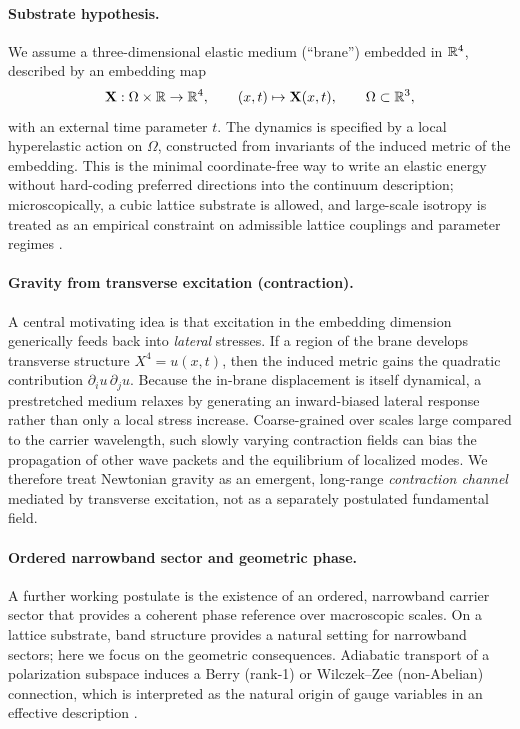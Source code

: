 \paragraph{Substrate hypothesis.}
We assume a three-dimensional elastic medium (``brane'') embedded in $\mathbb{R}^4$, described by an embedding map
\begin{equation}
  \mathbf{X}:\Omega\times\mathbb{R} \to \mathbb{R}^4, \qquad (x,t)\mapsto \mathbf{X}(x,t), \qquad \Omega\subset\mathbb{R}^3,
  \label{eq:embedding-map}
\end{equation}
with an external time parameter $t$.
The dynamics is specified by a local hyperelastic action on $\Omega$, constructed from invariants of the
induced metric of the embedding.
This is the minimal coordinate-free way to write an elastic energy without hard-coding preferred directions into the
continuum description; microscopically, a cubic lattice substrate is allowed, and large-scale isotropy is treated as an
empirical constraint on admissible lattice couplings and parameter regimes \citep{Ogden1984,Holzapfel2000,DoCarmo1992}.

\paragraph{Gravity from transverse excitation (contraction).}
A central motivating idea is that excitation in the embedding dimension generically feeds back into
\emph{lateral} stresses.
If a region of the brane develops transverse structure $X^4=u(x,t)$, then the induced metric gains the quadratic
contribution $\partial_i u\,\partial_j u$.
Because the in-brane displacement is itself dynamical, a prestretched medium relaxes by generating an inward-biased
lateral response rather than only a local stress increase.
Coarse-grained over scales large compared to the carrier wavelength, such slowly varying contraction fields can bias the
propagation of other wave packets and the equilibrium of localized modes.
We therefore treat Newtonian gravity as an emergent, long-range \emph{contraction channel} mediated by transverse
excitation, not as a separately postulated fundamental field.

\paragraph{Ordered narrowband sector and geometric phase.}
A further working postulate is the existence of an ordered, narrowband carrier sector that provides
a coherent phase reference over macroscopic scales.
On a lattice substrate, band structure provides a natural setting for narrowband sectors; here we focus on the
geometric consequences.
Adiabatic transport of a polarization subspace induces a Berry (rank-1) or Wilczek--Zee (non-Abelian) connection,
which is interpreted as the natural origin of gauge variables in an effective description
\citep{Pancharatnam1956,Berry1984,WilczekZee1984,Bliokh2015SpinOrbit,Cisowski2022}.

